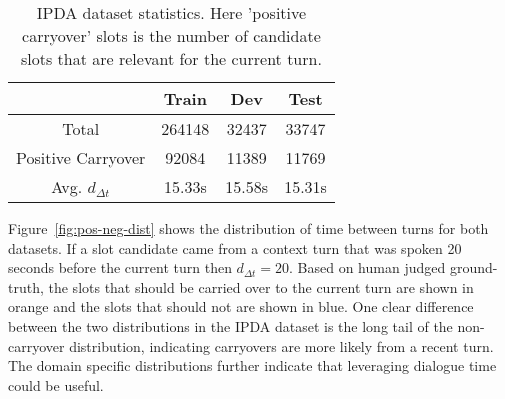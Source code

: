 \documentclass[11pt,a4paper]{article}
\begin{document}
\begin{table}[ht]
\small
\begin{center}
\begin{tabular}{|c||c|c|c|} \hline
& Train & Dev & Test \\\hline
Total & 264148 & 32437 & 33747 \\\hline
Positive Carryover & 92084 & 11389 & 11769 \\\hline
Avg. $d_{\Delta t}$ & 15.33s & 15.58s & 15.31s \\\hline
\end{tabular}
\end{center}
\caption{
IPDA dataset statistics. Here 'positive carryover' slots is the number of candidate slots that are relevant for the current turn.
}
\label{tbl:data}
\end{table}
Figure~\ref{fig:pos-neg-dist} shows the distribution of time between turns for both datasets.
If a slot candidate came from a context turn that was spoken 20 seconds before the current turn then $d_{\Delta t}=20$.
Based on human judged ground-truth, the slots that should be carried over to the current turn are shown in orange and the slots that should not are shown in blue.
One clear difference between the two distributions in the IPDA dataset is the long tail of the non-carryover distribution, indicating carryovers are more likely from a recent turn.
The domain specific distributions further indicate that leveraging dialogue time could be useful.

\begin{figure*}[ht]
\centering
{}
\vspace{-0.3cm}
\caption{
Distribution of temporal distance, $d_{\Delta t}$, for all candidate slots. The ``Carryover Slots", shown in orange, represent slot candidates found in the context that \textit{should} be carried over to the current turn.
}
\label{fig:pos-neg-dist}
\end{figure*}
\end{document}
